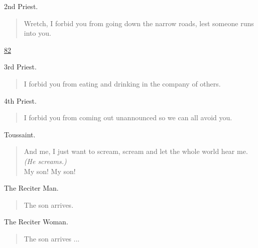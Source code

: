 \documentclass[letterpaper,article,12pt,oneside,notitlepage]{memoir}
\begin{document}
\begin{center}2nd Priest.\end{center}

\begin{verse}
Wretch, I forbid you from going down the narrow roads, lest someone runs into you. \\
\end{verse}

\clearpage

\href{http://cesaire.elotroalex.com/chiens/chiens/p082.html}{82}

\begin{center}3rd Priest.\end{center}

\begin{verse}
I forbid you from eating and drinking in the company of others. \\
\end{verse}

\begin{center}4th Priest.\end{center}

\begin{verse}
I forbid you from coming out unannounced so we can all avoid you. \\
\end{verse}

\begin{center}Toussaint.\end{center}

\begin{verse}
And me, I just want to scream, scream and let the whole world hear me. \textit{(He screams.)} \\
My son! My son! \\
\end{verse}

\begin{center}The Reciter Man.\end{center}

\begin{verse}
The son arrives. \\
\end{verse}

\begin{center}The Reciter Woman.\end{center}

\begin{verse}
The son arrives ... \\
\end{verse}
\end{document}
